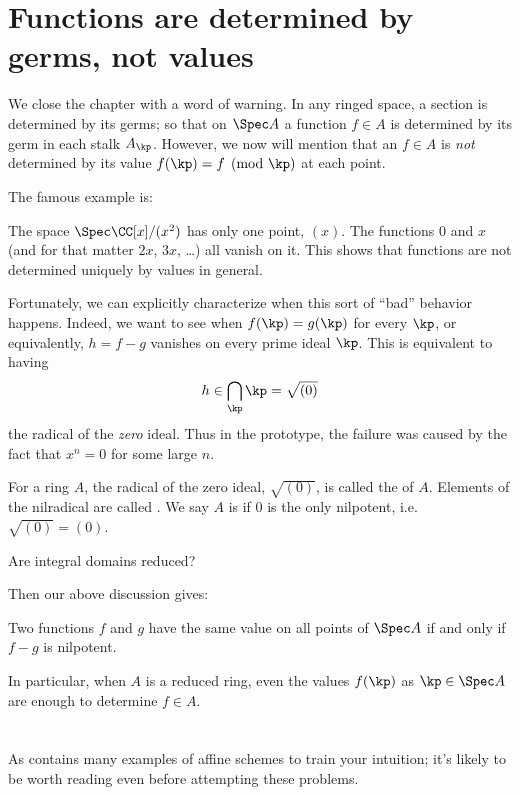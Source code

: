 \section{Functions are determined by germs, not values}

We close the chapter with a word of warning.
In any ringed space, a section is determined by its germs;
so that on $\Spec A$ a function $f \in A$ is determined
by its germ in each stalk $A_\kp$.
However, we now will mention that an $f \in A$ is \emph{not}
determined by its value $f(\kp) = f \pmod \kp$ at each point.

The famous example is:
\begin{example}
	The space $\Spec \CC[x] / (x^2)$ has only one point, $(x)$.
	The functions $0$ and $x$ (and for that matter $2x$, $3x$, \dots)
	all vanish on it.
	This shows that functions are not determined uniquely
	by values in general.
\end{example}

Fortunately, we can explicitly characterize
when this sort of ``bad'' behavior happens.
Indeed, we want to see when $f(\kp) = g(\kp)$ for every $\kp$,
or equivalently, $h = f-g$ vanishes on every prime ideal $\kp$.
This is equivalent to having
\[ h \in \bigcap_{\kp} \kp = \sqrt{(0)} \]
the radical of the \emph{zero} ideal.
Thus in the prototype, the failure was caused by the fact that $x^n = 0$
for some large $n$.

\begin{definition}
	For a ring $A$, the radical of the zero ideal, $\sqrt{(0)}$,
	is called the  of $A$.
	Elements of the nilradical are called .
	We say $A$ is  if $0$ is the only nilpotent,
	i.e.\ $\sqrt{(0)} = (0)$.
\end{definition}
\begin{ques}
	Are integral domains reduced?
\end{ques}

Then our above discussion gives:
\begin{theorem}
	Two functions $f$ and $g$ have the same value
	on all points of $\Spec A$ if and only if $f-g$ is nilpotent.
\end{theorem}
In particular, when $A$ is a reduced ring,
even the values $f(\kp)$ as $\kp \in \Spec A$
are enough to determine $f \in A$.

\section{\problemhead}
As  contains many
examples of affine schemes to train your intuition;
it's likely to be worth reading even before attempting these problems.


